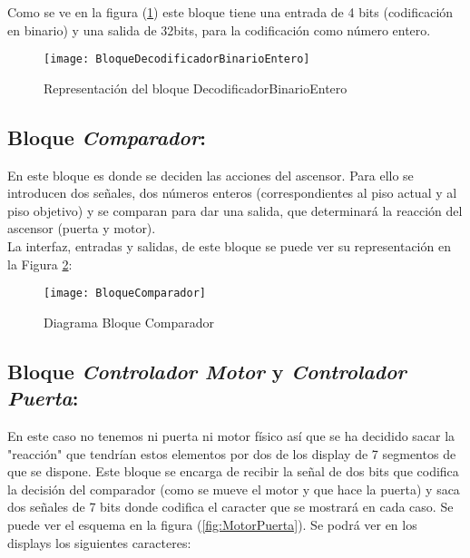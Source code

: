 	Como se ve en la figura (\ref{fig:BloqueDecodificadorBinarioEntero}) este bloque tiene una entrada de 4 bits (codificación en binario) y una salida de 32bits, para la codificación como número entero.
	\begin{figure}[H]
		    \centering
		    \texttt{[image: BloqueDecodificadorBinarioEntero]}
		    \caption{Representación del bloque DecodificadorBinarioEntero}
		    \label{fig:BloqueDecodificadorBinarioEntero}
	\end{figure}

\subsection{Bloque \textit{Comparador}:} \label{bloque:Comparador}

	En este bloque es donde se deciden las acciones del ascensor. Para ello se introducen dos señales, dos números enteros (correspondientes al piso actual y al piso objetivo) y se comparan para dar una salida, que determinará la reacción del ascensor (puerta y motor). \\ 

    La interfaz, entradas y salidas, de este bloque se puede ver su representación en la Figura \ref{fig:BloqueComparador}:
    
    \begin{figure}[H]
		    \centering
		    \texttt{[image: BloqueComparador]}
		    \caption{Diagrama Bloque Comparador}
		    \label{fig:BloqueComparador}
	\end{figure}



\subsection{Bloque \textit{Controlador Motor} y \textit{Controlador Puerta}:} \label{bloque:MotorPuerta}
    
    En este caso no tenemos ni puerta ni motor físico así que se ha decidido sacar la "reacción" que tendrían estos elementos por dos de los display de 7 segmentos de que se dispone. Este bloque se encarga de recibir la señal de dos bits que codifica la decisión del comparador (como se mueve el motor y que hace la puerta) y saca dos señales de 7 bits donde codifica el caracter que se mostrará en cada caso. Se puede ver el esquema en la figura (\ref{fig:MotorPuerta}). Se podrá ver en los displays los siguientes caracteres:\\ 

